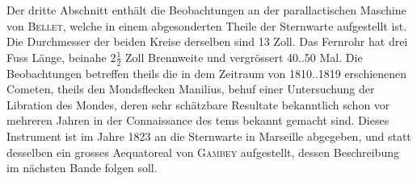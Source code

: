 Der dritte Abschnitt enthält die Beobachtungen an der parallactischen Maschine von \textsc{Bellet}, welche in einem abgesonderten Theile der Sternwarte aufgestellt ist. Die Durchmesser der beiden Kreise derselben sind 13 Zoll. Das Fernrohr hat drei Fuss Länge, beinahe $2\frac{1}{2}$ Zoll Brennweite und vergrössert 40..50 Mal. Die Beobachtungen betreffen theils die in dem Zeitraum von 1810..1819 erschienenen Cometen, theils den Mondsflecken Manilius, behuf einer Untersuchung der Libration des Mondes, deren sehr schätzbare Resultate bekanntlich schon vor mehreren Jahren in der Connaissance des tems bekannt gemacht sind. Dieses Instrument ist im Jahre 1823 an die Sternwarte in Marseille abgegeben, und statt desselben ein grosses Aequatoreal von \textsc{Gambey} aufgestellt, dessen Beschreibung im nächsten Bande folgen soll.
